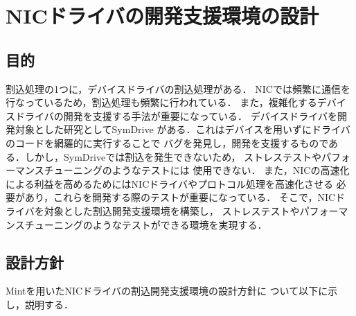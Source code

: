 \documentclass[submit,techreq,noauthor,dvipdfmx]{ipsj}
\begin{document}
\section{NICドライバの開発支援環境の設計}\label{chap:design_of_debugging_invironment_of_NIC}

\subsection{目的}\label{sec:purpose}

割込処理の1つに，デバイスドライバの割込処理がある．
NICでは頻繁に通信を行なっているため，割込処理も頻繁に行われている．
また，複雑化するデバイスドライバの開発を支援する手法が重要になっている．
デバイスドライバを開発対象とした研究としてSymDrive\cite{renzelmann2012symdrive}
がある．これはデバイスを用いずにドライバのコードを網羅的に実行することで
バグを発見し，開発を支援するものである．しかし，SymDriveでは割込を発生できないため，
ストレステストやパフォーマンスチューニングのようなテストには
使用できない．
また，NICの高速化による利益を高めるためにはNICドライバやプロトコル処理を高速化させる
必要があり\cite{matsumoto2013x86}，これらを開発する際のテストが重要になっている．
そこで，NICドライバを対象とした割込開発支援環境を構築し，
ストレステストやパフォーマンスチューニングのようなテストができる環境を実現する．

\subsection{設計方針}\label{sec:policy_of_design}

Mintを用いたNICドライバの割込開発支援環境の設計方針に
ついて以下に示し，説明する．
\end{document}
